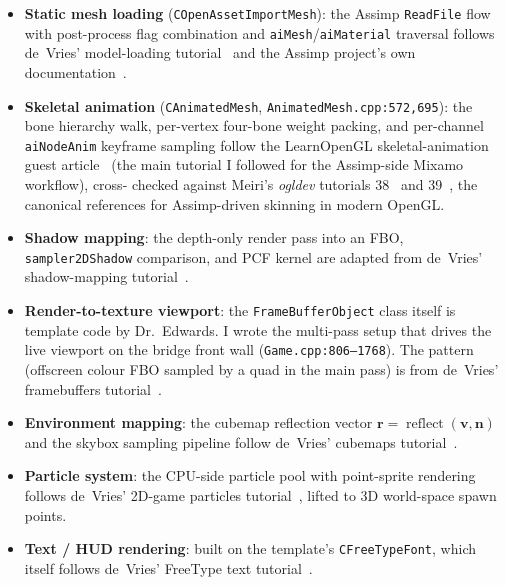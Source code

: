 \documentclass[11pt,a4paper]{article}
\begin{document}
\begin{itemize}
  \item \textbf{Static mesh loading} (\texttt{COpenAssetImportMesh}): the
        Assimp \texttt{ReadFile} flow with post-process flag combination
        and \texttt{aiMesh}/\texttt{aiMaterial} traversal follows
        de~Vries' model-loading tutorial~\cite{learnopengl_modelloading} and
        the Assimp project's own
        documentation~\cite{assimp}.
  \item \textbf{Skeletal animation} (\texttt{CAnimatedMesh},
        \texttt{AnimatedMesh.cpp:572,695}): the bone hierarchy walk,
        per-vertex four-bone weight packing, and per-channel
        \texttt{aiNodeAnim} keyframe sampling follow the LearnOpenGL
        skeletal-animation guest article~\cite{learnopengl_skeletal} (the
        main tutorial I followed for the Assimp-side Mixamo workflow), cross-
        checked against Meiri's \emph{ogldev} tutorials
        38~\cite{ogldev_skeletal} and 39~\cite{ogldev_skeletal_split}, the
        canonical references for Assimp-driven skinning in modern OpenGL.
  \item \textbf{Shadow mapping}: the depth-only render pass into an FBO,
        \texttt{sampler2DShadow} comparison, and PCF kernel are adapted from
        de~Vries' shadow-mapping
        tutorial~\cite{learnopengl_shadows}.
  \item \textbf{Render-to-texture viewport}: the
        \texttt{FrameBufferObject} class itself is template code by
        Dr.~Edwards. I wrote the multi-pass setup that drives the live
        viewport on the bridge front wall (\texttt{Game.cpp:806--1768}).
        The pattern (offscreen colour FBO sampled by a quad in the main
        pass) is from de~Vries' framebuffers
        tutorial~\cite{learnopengl_framebuffers}.
  \item \textbf{Environment mapping}: the cubemap reflection vector
        $\mathbf{r} = \operatorname{reflect}(\mathbf{v}, \mathbf{n})$ and the
        skybox sampling pipeline follow de~Vries'
        cubemaps tutorial~\cite{learnopengl_cubemaps}.
  \item \textbf{Particle system}: the CPU-side particle pool with
        point-sprite rendering follows de~Vries'
        2D-game particles tutorial~\cite{learnopengl_particles}, lifted
        to 3D world-space spawn points.
  \item \textbf{Text / HUD rendering}: built on the template's
        \texttt{CFreeTypeFont}, which itself follows de~Vries'
        FreeType text tutorial~\cite{learnopengl_text}.

\end{itemize}
\end{document}
